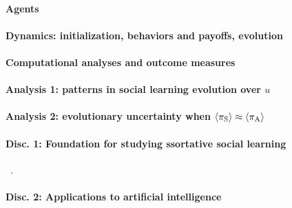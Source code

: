 \documentclass[letterpaper,11.5pt]{scrartcl}
\begin{document}
\paragraph{Agents}

\paragraph{Dynamics: initialization, behaviors and payoffs, evolution}

\paragraph{Computational analyses and outcome measures}

\paragraph{Analysis 1: patterns in social learning evolution over $u$}

\paragraph{Analysis 2: evolutionary uncertainty when $\langle \pi_\mathrm{S} \rangle \approx \langle \pi_\mathrm{A} \rangle$}

\paragraph{Disc. 1: Foundation for studying ssortative social learning}~\cite{Katsnelson2014}.

\paragraph{Disc. 2: Applications to artificial
intelligence}~\cite{Sandholm1996,Jaques2019,Ndousse2021,Gronauer2022}



\end{document}

